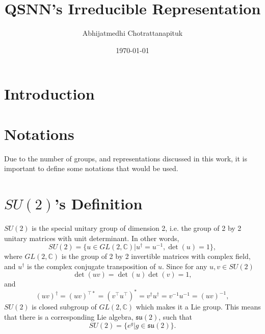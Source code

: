 \documentclass[12pt]{revtex4-2}
\begin{document}
\title{QSNN's Irreducible Representation}
\author{Abhijatmedhi Chotrattanapituk}

\date{\today}
\maketitle

\section{Introduction}


\section{Notations}
Due to the number of groups, and representations discussed in this work, it is important to define some notations that would be used. 

\section{$SU(2)$'s Definition}
$SU(2)$ is the special unitary group of dimension 2, i.e. the group of 2 by 2 unitary matrices 
with unit determinant. In other words,
\begin{equation}
    SU(2) = \{u \in GL(2, \mathbb{C})|u^\dagger=u^{-1}, \det(u) = 1\},
\end{equation}    
where $GL(2,\mathbb{C})$ is the group of 2 by 2 invertible matrices with complex field, and $u^\dagger$
is the complex conjugate transposition of $u$. Since for any $u, v \in SU(2)$
\begin{equation}
    \det(uv) = \det(u)\det(v) = 1,
\end{equation}
and
\begin{equation}
    (uv)^\dagger = (uv)^{\top\ast} = (v^\top u^\top)^\ast = v^\dagger u^\dagger = v^{-1}u^{-1} = (uv)^{-1},
\end{equation}
$SU(2)$ is closed subgroup of $GL(2, \mathbb{C})$ which makes it a Lie group. This means that
there is a corresponding Lie algebra, $\mathfrak{su(2)}$, such that 
\begin{equation}
    SU(2) = \{e^g|g \in \mathfrak{su(2)}\}.
\end{equation}
\end{document}
